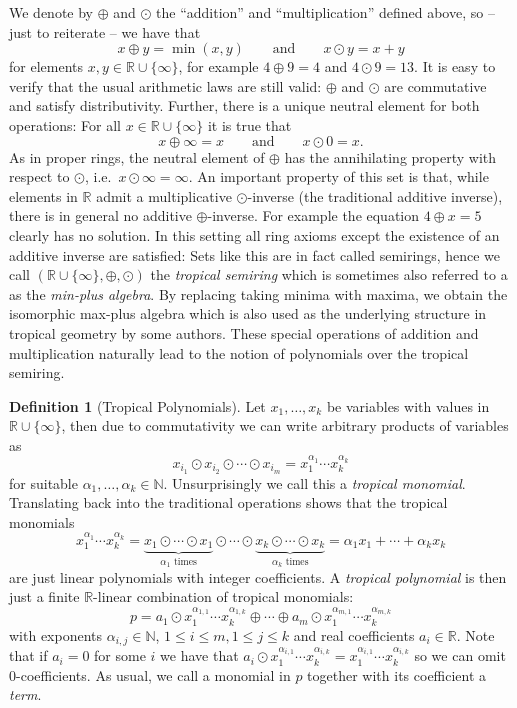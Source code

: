 \documentclass[
  paper=a4,
  DIV=14,
  fontsize=12pt,
  titlepage,
  bibliography=totoc,
  listof=totoc,
  pagesize=pdftex
]{scrartcl}
\numberwithin{figure}{section}
\numberwithin{equation}{section}
\numberwithin{table}{section}
\newcommand*\setR{\mathds{R}}
\newcommand*\setN{\mathds{N}}
\theoremstyle{definition}
\newtheorem{definition}{Definition}
\numberwithin{definition}{section}
\begin{document}
We denote by $\oplus$ and $\odot$ the \enquote{addition} and \enquote{multiplication}
defined above, so -- just to reiterate -- we have that
\[
  x \oplus y = \min(x,y)
  \qquad \text{and} \qquad
  x \odot y = x+y
\]
for elements $x,y\in \setR\cup\{\infty\}$, for example $4\oplus9 = 4$ and $4\odot9 = 13$.
It is easy to verify that the usual arithmetic laws are still valid: $\oplus$ and $\odot$
are commutative and satisfy distributivity. Further, there is a unique neutral  element
for both operations: For all $x\in \setR\cup \{\infty\}$ it is true that
\[
  x \oplus \infty = x
  \qquad \text{and} \qquad
  x \odot 0 = x.
\]
As in proper rings, the neutral element of $\oplus$ has the annihilating property with
respect to $\odot$, i.e.\ $x\odot \infty = \infty$. An important property of this set is
that, while elements in $\setR$ admit a multiplicative $\odot$-inverse (the traditional
additive inverse), there is in general no additive $\oplus$-inverse. For example the
equation $4\oplus x = 5$ clearly has no solution. In this setting all ring axioms except
the existence of an additive inverse are satisfied: Sets like this are in fact called
semirings, hence we call $(\setR\cup \{\infty\}, \oplus, \odot)$ the \emph{tropical
semiring} which is sometimes also referred to a as the \emph{min-plus algebra}. By
replacing taking minima with maxima, we obtain the isomorphic max-plus algebra which is
also used as the underlying structure in tropical geometry by some authors. These special
operations of addition and multiplication naturally lead to the notion of polynomials over
the tropical semiring.

\begin{definition}[Tropical Polynomials]
  Let $x_1, \dots, x_k$ be variables with values in $\setR\cup\{\infty\}$, then due to
  commutativity we can write arbitrary products of variables as
  \[
    x_{i_1} \odot x_{i_2} \odot \cdots \odot x_{i_m}
    = x_1^{\alpha_1} \cdots x_k^{\alpha_k}
  \]
  for suitable $\alpha_1, \dots, \alpha_k \in \setN$. Unsurprisingly we call this a
  \emph{tropical monomial}. Translating back into the traditional operations shows that
  the tropical monomials
  \[
    x_1^{\alpha_1} \cdots x_k^{\alpha_k} =
    \underbrace{x_1\odot\cdots\odot x_1}_{\alpha_1 \text{ times}}
    \odot\cdots\odot
    \underbrace{x_k\odot\cdots\odot x_k}_{\alpha_k \text{ times}}
    = \alpha_1x_1 + \cdots + \alpha_kx_k
  \]
  are just linear polynomials with integer coefficients. A \emph{tropical polynomial} is
  then just a finite $\setR$-linear combination of tropical monomials:
  \[
    p = a_1 \odot x_1^{\alpha_{1,1}}\cdots x_k^{\alpha_{1,k}} \oplus \cdots \oplus
    a_m \odot x_1^{\alpha_{m,1}}\cdots x_k^{\alpha_{m,k}}
  \]
  with exponents $\alpha_{i,j} \in \setN$, $1\leq i \leq m, 1\leq j \leq k$ and real
  coefficients $a_i \in \setR$. Note that if $a_i = 0$ for some $i$ we have that $a_i\odot
  x_1^{\alpha_{i,1}}\cdots x_k^{\alpha_{i,k}} = x_1^{\alpha_{i,1}}\cdots
  x_k^{\alpha_{i,k}}$ so we can omit $0$-coefficients. As usual, we call a monomial in $p$
  together with its coefficient a \emph{term}.
  \label{def:tropPoly}
\end{definition}
\end{document}
